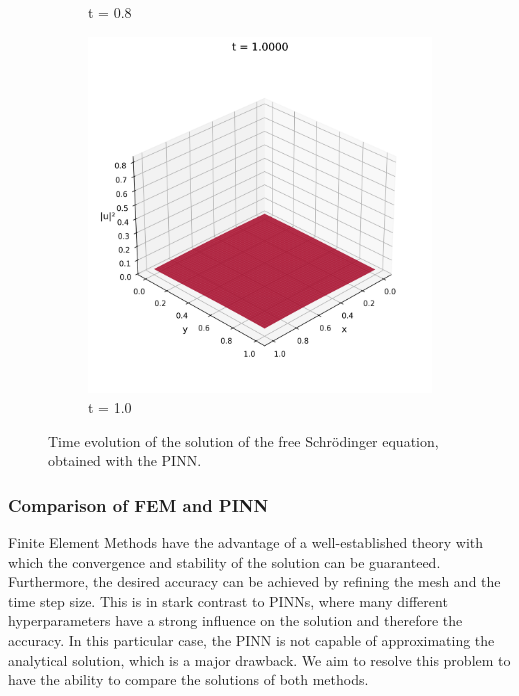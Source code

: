 \documentclass{article}
\theoremstyle{definition}
\theoremstyle{plain}
\theoremstyle{remark}
\begin{document}
\begin{figure}[h]
\begin{subfigure}[b]{0.3\textwidth}
    \caption{t = 0.8}
  \end{subfigure}
  \hfill
  \begin{subfigure}[b]{0.3\textwidth}
    \centering
    \includegraphics[width=\textwidth, trim=0cm 0cm 0cm 1cm, clip]{figures/pinn_frame_0050.png}
    \caption{t = 1.0}
  \end{subfigure}
  \caption{Time evolution of the solution of the free Schrödinger equation, obtained with the PINN.}
  \label{fig:free_solution_evolution_pinn}
\end{figure}

\subsubsection*{Comparison of FEM and PINN}

Finite Element Methods have the advantage of a well-established theory with which the convergence and stability of the solution can be guaranteed.
Furthermore, the desired accuracy can be achieved by refining the mesh and the time step size.
This is in stark contrast to PINNs, where many different hyperparameters have a strong influence on the solution and therefore the accuracy. 
In this particular case, the PINN is not capable of approximating the analytical solution, which is a major drawback.
We aim to resolve this problem to have the ability to compare the solutions of both methods.
\end{document}
